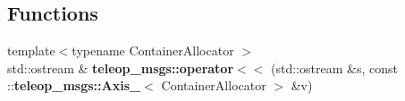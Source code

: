 \subsection*{Functions}
\begin{DoxyCompactItemize}
\item 
{\footnotesize template$<$typename ContainerAllocator $>$ }\\std::ostream \& {\bf teleop\_\-msgs::operator$<$$<$} (std::ostream \&s, const ::{\bf teleop\_\-msgs::Axis\_\-}$<$ ContainerAllocator $>$ \&v)
\end{DoxyCompactItemize}
